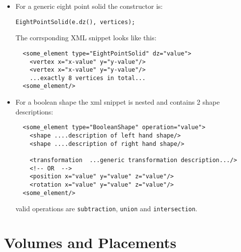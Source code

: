 \begin{itemize}
\item For a generic eight point solid the constructor is:
\begin{verbatim}
EightPointSolid(e.dz(), vertices);
\end{verbatim}
The corrsponding XML snippet looks like this:
\begin{verbatim}
  <some_element type="EightPointSolid" dz="value">
    <vertex x="x-value" y="y-value"/>
    <vertex x="x-value" y="y-value"/>
    ...exactly 8 vertices in total...
  <some_element/>
\end{verbatim}

\item For a boolean shape the xml snippet is nested and contains 2 shape descriptions:
\begin{verbatim}
  <some_element type="BooleanShape" operation="value">
    <shape ....description of left hand shape/>
    <shape ....description of right hand shape/>

    <transformation  ...generic transformation description.../>
    <!-- OR  -->
    <position x="value" y="value" z="value"/>
    <rotation x="value" y="value" z="value"/>
  <some_element/>
\end{verbatim}
valid operations are \texttt{subtraction}, \texttt{union} and \texttt{intersection}.

\end{itemize}

\section{Volumes and Placements}


